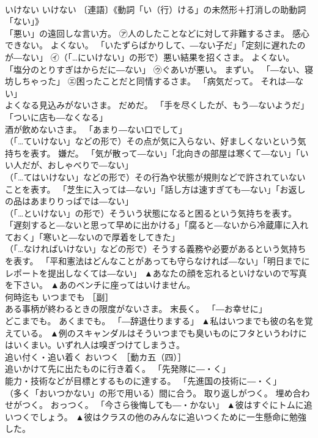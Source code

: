 \documentclass[8pt]{extreport}
\begin{document}
\begin{CJK}{UTF8}{min}
\\	いけない	いけない	〔連語〕《動詞「い（行）ける」の未然形＋打消しの助動詞「ない」》 
\\	「悪い」の遠回しな言い方。 ㋐人のしたことなどに対して非難するさま。 感心できない。 よくない。 「いたずらばかりして、―ない子だ」「定刻に遅れたのが―ない」 ㋑（「…にいけない」の形で）悪い結果を招くさま。 よくない。 「塩分のとりすぎはからだに―ない」 ㋒ぐあいが悪い。 まずい。 「―ない、寝坊しちゃった」 ㋓困ったことだと同情するさま。 「病気だって。 それは―ない」 
\\	よくなる見込みがないさま。 だめだ。 「手を尽くしたが、もう―ないようだ」「ついに店も―なくなる」 
\\	酒が飲めないさま。 「あまり―ない口でして」 
\\	（「…ていけない」などの形で）その点が気に入らない、好ましくないという気持ちを表す。 嫌だ。 「気が散って―ない」「北向きの部屋は寒くて―ない」「いい人だが、おしゃべりで―ない」 
\\	（「…てはいけない」などの形で）その行為や状態が規則などで許されていないことを表す。 「芝生に入っては―ない」「話し方は速すぎても―ない」「お返しの品はあまりりっぱでは―ない」 
\\	（「…といけない」の形で）そういう状態になると困るという気持ちを表す。 「遅刻すると―ないと思って早めに出かける」「腐ると―ないから冷蔵庫に入れておく」「寒いと―ないので厚着をしてきた」 
\\	（「…なければいけない」などの形で）そうする義務や必要があるという気持ちを表す。 「平和憲法はどんなことがあっても守らなければ―ない」「明日までにレポートを提出しなくては―ない」	▲あなたの顔を忘れるといけないので写真を下さい。 ▲あのベンチに座ってはいけません。
\\	何時迄も	いつまでも	［副］ 
\\	ある事柄が終わるときの限度がないさま。 末長く。 「―お幸せに」 
\\	どこまでも。 あくまでも。 「―辞退仕りまする」	▲私はいつまでも彼の名を覚えている。 ▲例のスキャンダルはそういつまでも臭いものにフタというわけにはいくまい。いずれ人は嗅ぎつけてしまうさ。
\\	追い付く・追い着く	おいつく	［動カ五（四）］ 
\\	追いかけて先に出たものに行き着く。 「先発隊に―・く」 
\\	能力・技術などが目標とするものに達する。 「先進国の技術に―・く」 
\\	（多く「おいつかない」の形で用いる）間に合う。 取り返しがつく。 埋め合わせがつく。 おっつく。 「今さら後悔しても―・かない」	▲彼はすぐにトムに追いつくでしょう。 ▲彼はクラスの他のみんなに追いつくために一生懸命に勉強した。

\end{CJK}
\end{document}
